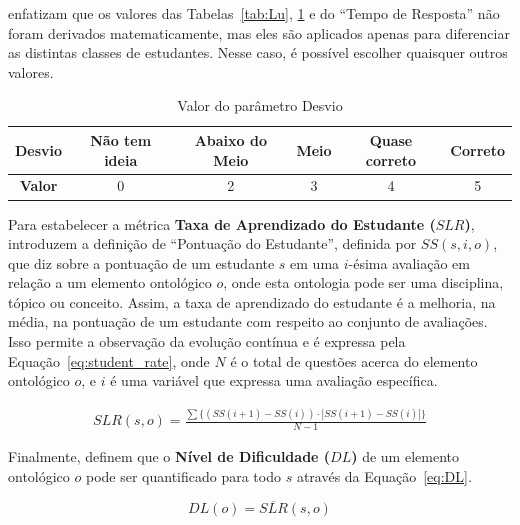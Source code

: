 \cite{Biswas:2007} enfatizam que os valores das Tabelas~\ref{tab:Lu}, \ref{tab:Weight_Biswas} e do ``Tempo de Resposta'' não foram derivados matematicamente, mas eles são aplicados apenas para diferenciar as distintas classes de estudantes. Nesse caso, é possível escolher quaisquer outros valores.

\begin{table}[htbp]
\caption{Valor do parâmetro Desvio}
\centering
\begin{tabular}{|c|c|c|c|c|c|}
\hline
\textbf{Desvio} & \textbf{Não tem ideia} & \textbf{Abaixo do Meio} & \textbf{Meio} & \textbf{Quase correto} & \textbf{Correto} \\ \hline
\textbf{Valor} & 0 & 2 & 3 & 4 & 5\\ \hline
\end{tabular}
\label{tab:Weight_Biswas}
\end{table}

Para estabelecer a métrica \textbf{Taxa de Aprendizado do Estudante ($SLR$)}, \cite{Biswas:2007} introduzem a definição de ``Pontuação do Estudante'', definida por $SS (s,i,o)$, que diz sobre a pontuação de um estudante $s$ em uma $i$-ésima avaliação em relação a um elemento ontológico $o$, onde esta ontologia pode ser uma disciplina, tópico ou conceito.
Assim, a taxa de aprendizado do estudante é a melhoria, na média, na pontuação de um estudante com respeito ao conjunto de avaliações. Isso permite a observação da evolução contínua e é expressa pela Equação~\ref{eq:student_rate}, onde $N$ é o total de questões acerca do elemento ontológico $o$, e $i$ é uma variável que expressa uma avaliação específica.

\begin{equation}\label{eq:student_rate}
\begin{split}
SLR(s,o) =  \frac{\sum \{(SS(i+1)-SS(i)) \cdot |SS(i+1)-SS(i)| \} }{N-1}
\end{split}
\end{equation}


Finalmente, \cite{Biswas:2007} definem que o \textbf{Nível de Dificuldade ($DL$)} de um elemento ontológico $o$ pode ser quantificado para todo $s$ através da Equação~\ref{eq:DL}.

\begin{equation}\label{eq:DL}
DL(o) = \overline{SLR}(s,o)
\end{equation}

